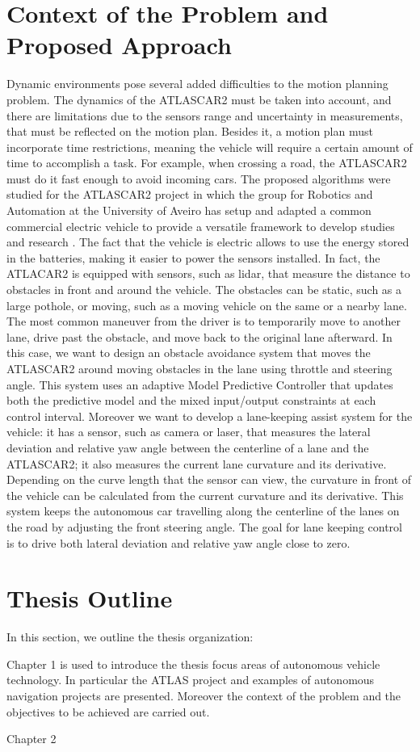 \section{Context of the Problem and Proposed Approach}\label{sec:context}
Dynamic environments pose several added difficulties to the motion planning problem. The dynamics of the ATLASCAR2 must be taken into account, and there are limitations due to the sensors range and uncertainty in measurements, that must be reflected on the motion plan. Besides it, a motion plan must incorporate time restrictions, meaning the vehicle will require a certain amount of time to accomplish a task. For example, when crossing a road, the ATLASCAR2 must do it fast enough to avoid incoming cars. The proposed algorithms were studied for the ATLASCAR2 project in which the group for Robotics and Automation at the University of Aveiro has setup and adapted a common commercial electric vehicle to provide a versatile  framework  to  develop  studies  and  research \cite{vsantos2010} \cite{vsantos2019}. The fact that the vehicle is electric allows to use the energy stored in the batteries, making it easier to power the sensors installed. In fact, the ATLACAR2 is equipped with sensors, such as lidar, that measure the distance to obstacles in front and around the vehicle. The obstacles can be static, such as a large pothole, or moving, such as a moving vehicle on the same or a nearby lane. The most common maneuver from the driver is to temporarily move to another lane, drive past the obstacle, and move back to the original lane afterward. In this case, we want to design an obstacle avoidance system that moves the ATLASCAR2 around  moving obstacles in the lane using throttle and steering angle. This system uses an adaptive Model Predictive Controller that updates both the predictive model and the mixed input/output constraints at each control interval. Moreover we want to develop a lane-keeping assist system for the vehicle: it has a sensor, such as camera or laser, that measures the lateral deviation and relative yaw angle between the centerline of a lane and the ATLASCAR2; it also measures the current lane curvature and its derivative. Depending on the curve length that the sensor can view, the curvature in front of the vehicle can be calculated from the current curvature and its derivative. This system keeps the autonomous car travelling along the centerline of the lanes on the road by adjusting the front steering angle. The goal for lane keeping control is to drive both lateral deviation and relative yaw angle close to zero.

\section{Thesis Outline}\label{sec:outline}

In this section, we outline the thesis organization: 

Chapter 1 is used to introduce the thesis focus areas of autonomous vehicle technology. In particular the ATLAS project and examples of autonomous navigation projects are presented. Moreover the context of the problem and the objectives to be achieved are carried out.

Chapter 2 



